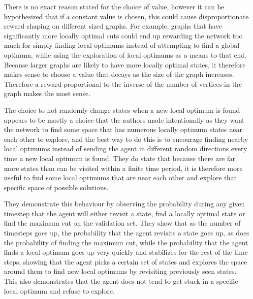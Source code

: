 \documentclass{article}
\begin{document}
There is no exact reason stated for the choice of value, however it can be hypothesized that if a constant value is chosen, this could cause disproportionate reward shaping on different sized graphs. For example, graphs that have significantly more locally optimal cuts could end up rewarding the network too much for simply finding local optimums instead of attempting to find a global optimum, while using the exploration of local optimums as a means to that end. Because larger graphs are likely to have more locally optimal states, it therefore makes sense to choose a value that decays as the size of the graph increases. Therefore a reward proportional to the inverse of the number of vertices in the graph makes the most sense. 

The choice to not randomly change states when a new local optimum is found appears to be mostly a choice that the authors made intentionally as they want the network to find some space that has numerous locally optimum states near each other to explore, and the best way to do this is to encourage finding nearby local optimums instead of sending the agent in different random directions every time a new local optimum is found. They do state that because there are far more states than can be visited within a finite time period, it is therefore more useful to find some local optimums that are near each other and explore that specific space of possible solutions.

They demonstrate this behaviour by observing the probability during any given timestep that the agent will either revisit a state, find a locally optimal state or find the maximum cut on the validation set. They show that as the number of timesteps goes up, the probability that the agent revisits a state goes up, as does the probability of finding the maximum cut, while the probability that the agent finds a local optimum goes up very quickly and stabilizes for the rest of the time steps, showing that the agent picks a certain set of states and explores the space around them to find new local optimums by revisiting previously seen states. This also demonstrates that the agent does not tend to get stuck in a specific local optimum and refuse to explore. 
\end{document}
